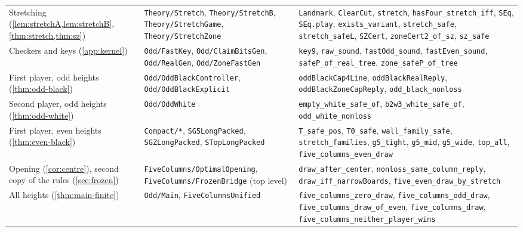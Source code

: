 \documentclass[11pt,a4paper]{article}
\theoremstyle{plain}
\theoremstyle{definition}
\newcommand{\code}[1]{{\upshape\texttt{\small\nolinkurl{#1}}}}
\begin{document}
\begin{table}[!htbp]
\begin{tabularx}{\linewidth}{@{}L{3.3cm} L{3.9cm} Y@{}}
Stretching (\cref{lem:stretchA,lem:stretchB}, \cref{thm:stretch,thm:sz}) & \code{Theory/Stretch}, \code{Theory/StretchB}, \code{Theory/StretchGame}, \code{Theory/StretchZone} & \code{Landmark}, \code{ClearCut}, \code{stretch}, \code{hasFour_stretch_iff}, \code{SEq}, \code{SEq.play}, \code{exists_variant}, \code{stretch_safe}, \code{stretch_safeL}, \code{SZCert}, \code{zoneCert2_of_sz}, \code{sz_safe} \\
Checkers and keys (\cref{app:kernel}) & \code{Odd/FastKey}, \code{Odd/ClaimBitsGen}, \code{Odd/RealGen}, \code{Odd/ZoneFastGen} & \code{key9}, \code{raw_sound}, \code{fastOdd_sound}, \code{fastEven_sound}, \code{safeP_of_real_tree}, \code{zone_safeP_of_tree} \\
First player, odd heights (\cref{thm:odd-black}) & \code{Odd/OddBlackController}, \code{Odd/OddBlackExplicit} & \code{oddBlackCap4Line}, \code{oddBlackRealReply}, \code{oddBlackZoneCapReply}, \code{odd_black_nonloss} \\
Second player, odd heights (\cref{thm:odd-white}) & \code{Odd/OddWhite} & \code{empty_white_safe_of}, \code{b2w3_white_safe_of}, \code{odd_white_nonloss} \\
First player, even heights (\cref{thm:even-black}) & \code{Compact/*}, \code{SG5LongPacked}, \code{SGZLongPacked}, \code{STopLongPacked} & \code{T_safe_pos}, \code{T0_safe}, \code{wall_family_safe}, \code{stretch_families}, \code{g5_tight}, \code{g5_mid}, \code{g5_wide}, \code{top_all}, \code{five_columns_even_draw} \\
Opening (\cref{cor:centre}), second copy of the rules (\cref{sec:frozen}) & \code{FiveColumns/OptimalOpening}, \code{FiveColumns/FrozenBridge} (top level) & \code{draw_after_center}, \code{nonloss_same_column_reply}, \code{draw_iff_narrowBoards}, \code{five_even_draw_by_stretch} \\
All heights (\cref{thm:main-finite}) & \code{Odd/Main}, \code{FiveColumnsUnified} & \code{five_columns_zero_draw}, \code{five_columns_odd_draw}, \code{five_columns_draw_of_even}, \code{five_columns_draw}, \code{five_columns_neither_player_wins} \\
\bottomrule
\end{tabularx}
\end{table}
\end{document}
